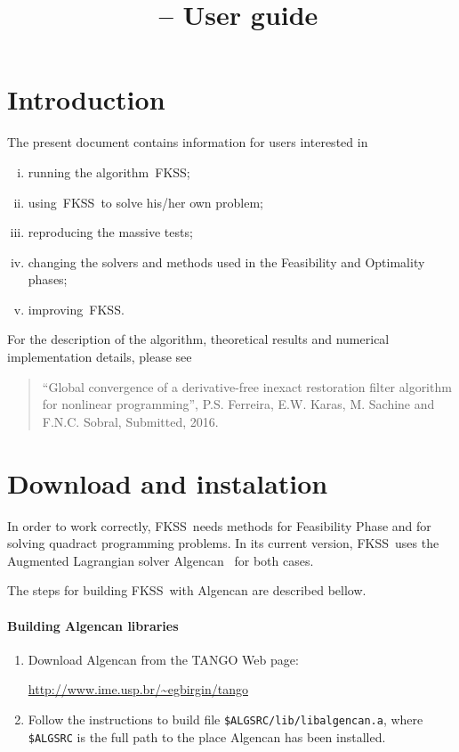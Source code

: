 \documentclass[a4paper,12pt]{article}
\title{\fkss\ -- User guide}
\author{}
\date{}
\newcommand{\fkss}{\textsc{FKSS}}
\begin{document}
\maketitle

\tableofcontents

\section{Introduction}

The present document contains information for users interested in
\begin{enumerate}[(i)]
\item running the algorithm~\fkss;
\item using~\fkss\ to solve his/her own problem;
\item reproducing the massive tests;
\item changing the solvers and methods used in the Feasibility and
  Optimality phases;
\item improving~\fkss.
\end{enumerate}

For the description of the algorithm, theoretical results and
numerical implementation details, please see
\begin{quote}
  ``Global convergence of a derivative-free inexact restoration filter
  algorithm for nonlinear programming'', P.S. Ferreira, E.W. Karas,
  M. Sachine and F.N.C. Sobral, Submitted, 2016.
\end{quote}

\section{Download and instalation} \label{download}

In order to work correctly, \fkss\ needs methods for Feasibility Phase
and for solving quadract programming problems. In its current version,
\fkss\ uses the Augmented Lagrangian solver Algencan~\cite{anbimasc07}
for both cases.

The steps for building \fkss\ with Algencan are described bellow.

\paragraph{Building Algencan libraries}
\begin{enumerate}
\item Download Algencan from the TANGO Web page:
  \begin{center}
    \url{http://www.ime.usp.br/~egbirgin/tango}
  \end{center}
\item Follow the instructions to build file
  \verb+$ALGSRC/lib/libalgencan.a+, where \verb+$ALGSRC+ is the full
  path to the place Algencan has been installed.
\end{enumerate}
\end{document}
